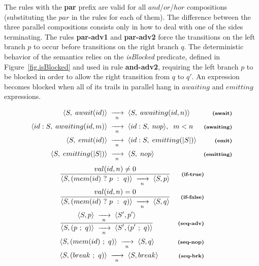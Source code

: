 \documentclass{acm_proc_article-sp}
\newcommand{\ST}{\1\xrightarrow[~n~]{}\1}
\newcommand{\LL}{\langle}
\newcommand{\RR}{\rangle}
\newcommand{\DS}{\displaystyle}
\newcommand{\rr}[1] {{\textbf{\scriptsize{#1}}}}
\newcommand{\1}{\;}
\newcommand{\2}{\;\;}
\newcommand{\3}{\;\;\;}
\newcommand{\5}{\;\;\;\;\;}
\begin{document}
The rules with the \rr{par} prefix are valid for all $and$/$or$/$hor$ 
compositions (substituting the $par$ in the rules for each of them).
%
The difference between the three parallel compositions consists only in how to 
deal with one of the sides terminating.
%
The rules \rr{par-adv1} and \rr{par-adv2} force the transitions on the left 
branch $p$ to occur before transitions on the right branch $q$.
%
The deterministic behavior of the semantics relies on the \emph{isBlocked} 
predicate, defined in Figure~\ref{fig.isBlocked} and used in rule 
\rr{and-adv2}, requiring the left branch $p$ to be blocked in order to allow 
the right transition from $q$ to $q'$.
%
An expression becomes blocked when all of its trails in parallel hang in 
$awaiting$ and $emitting$ expressions.

\begin{figure}
%
{ \setlength{\jot}{7pt}
\begin{align*}
\LL S,\1await(id) \RR &\ST
\LL S,\1awaiting(id,n) \RR
    & \rr{(await)}      \\
\LL id:S,\1awaiting(id,m) \RR &\ST
\LL id:S,\1nop \RR, \2m<n
    & \rr{(awaiting)}   \\
\LL S,\1emit(id) \RR &\ST
\LL id:S,\1emitting(|S|) \RR
    & \rr{(emit)}       \\
\LL S,\1emitting(|S|) \RR &\ST
\LL S,\1nop \RR
    & \rr{(emitting)}
\end{align*}
}
%
{ %
\begin{eqnarray*}
& \frac
    { \DS val(id,n) \neq 0 }
    { \DS \LL S, (mem(id)~?~p~:~q) \RR \ST
          \LL S, p \RR }
    & \rr{(if-true)}       \\
& \frac
    { \DS val(id,n) = 0 }
    { \DS \LL S, (mem(id)~?~p~:~q) \RR \ST
          \LL S, q \RR }
    & \rr{(if-false)}       \\
& \frac
    {\DS \LL S,p \RR \ST \LL S',p' \RR }
    {\DS \LL S, (p~;~q) \RR \ST \LL S', (p'~;~q) \RR }
    & \rr{(seq-adv)}        \\
& \LL S, (mem(id)~;~q) \RR \ST  \LL S, q \RR
    & \rr{(seq-nop)}        \\
& \LL S, (break~;~q) \RR \ST \LL S, break \RR
    & \rr{(seq-brk)}        \\
%

\end{eqnarray*}}
\end{figure}
\end{document}
